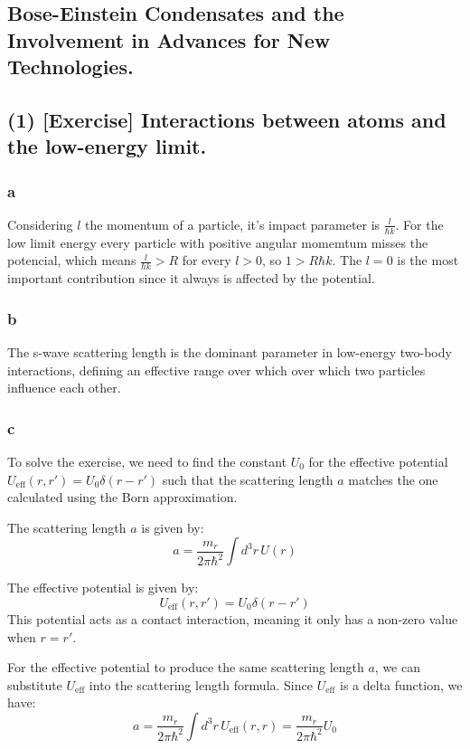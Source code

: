 \documentclass[12pt]{article}
\begin{document}
\begin{flushleft}

\section*{Bose-Einstein Condensates and the Involvement in Advances for New Technologies.}

\subsection*{(1) [Exercise] Interactions between atoms and the low-energy limit.}

\subsubsection*{a}
Considering \(l\) the momentum of a particle, it's impact parameter is \(\frac{l}{\hbar k}\). For the low limit energy every particle with positive angular momemtum misses the potencial, which means \(\frac{l}{\hbar k} > R\) for every \(l>0\), so \(1 > R \hbar k\). 
The \(l=0\) is the most important contribution since it always is affected by the potential.

\subsubsection*{b}
The s-wave scattering length is the dominant parameter in low-energy two-body interactions, defining an effective range over which over which two particles influence each other.

\subsubsection*{c}

To solve the exercise, we need to find the constant \( U_0 \) for the effective potential \( U_{\text{eff}}(r, r') = U_0 \delta(r - r') \) such that the scattering length \( a \) matches the one calculated using the Born approximation.


The scattering length \( a \) is given by:
\[
a = \frac{m_r}{2 \pi \hbar^2} \int d^3 r \, U(r)
\]


The effective potential is given by:
\[
U_{\text{eff}}(r, r') = U_0 \delta(r - r')
\]
This potential acts as a contact interaction, meaning it only has a non-zero value when \( r = r' \).


For the effective potential to produce the same scattering length \( a \), we can substitute \( U_{\text{eff}} \) into the scattering length formula. Since \( U_{\text{eff}} \) is a delta function, we have:
\[
a = \frac{m_r}{2 \pi \hbar^2} \int d^3 r \, U_{\text{eff}}(r, r) = \frac{m_r}{2 \pi \hbar^2} U_0
\]



\end{flushleft}
\end{document}
